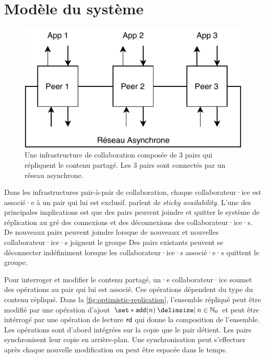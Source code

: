 

\section{Modèle du système}


\begin{figure}[htb]
\centering
\includegraphics{fig/impl.pdf}
\caption{Une infrastructure de collaboration composée de 3 pairs qui répliquent le contenu partagé. Les 3 pairs sont connectés par un réseau asynchrone.}\label{fig:collab-system}
\end{figure}

Dans les infrastructures pair-à-pair de collaboration, chaque collaborateur·ice est associé·e à un pair qui lui est exclusif.
\textcite{guerraoui_2016_tradeoffs-replication} parlent de \emph{sticky availability}.
L'une des principales implications est que des pairs peuvent joindre et quitter le système de réplication au gré des connexions et des déconnexions des collaborateur·ice·s.
De nouveaux pairs peuvent joindre lorsque de nouveaux et nouvelles collaborateur·ice·s joignent le groupe
Des pairs existants peuvent se déconnecter indéfiniment lorsque les collaborateur·ice·s associé·e·s quittent le groupe.

Pour interroger et modifier le contenu partagé, un·e collaborateur·ice soumet des opérations au pair qui lui est associé.
Ces opérations dépendent du type du contenu répliqué.
Dans la \autoref{fig:optimistic-replication}, l'ensemble répliqué peut être modifié par une opération d'ajout $\set*{\trm{add}(n) \given n \in \mathbb{N}_0}$ et peut être intérrogé par une opération de lecture $\operatorname{\mathsf{rd}}$ qui donne la composition de l'ensemble.
Les opérations sont d'abord intégrées sur la copie que le pair détient.
Les pairs synchronisent leur copie en arrière-plan.
Une synchronisation peut s'effectuer après chaque nouvelle modification ou peut être espacée dans le temps.

